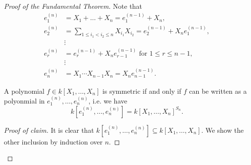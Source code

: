 \begin{proof}[Proof of the Fundamental Theorem]
 Note that
 \begin{align*}
  e^{(n)}_1 &= X_1 + \ldots + X_n = e_1^{(n-1)} + X_n, \\
  e^{(n)}_2 &= \sum_{1 \leq i_1 < i_2 \leq n} X_{i_1} X_{i_2} = e_2^{(n-1)} + X_n e_1^{(n-1)}, \\
            &\vdots \tag{$\ast$}\\ 
  e^{(n)}_r &= e^{(n-1)}_r + X_n e^{(n-1)}_{r-1} \text{ for } 1 \leq r \leq n-1, \\
            &\vdots \\
  e^{(n)}_n &= X_1 \cdots X_{n-1} X_n = X_n e^{(n-1)}_{n-1}.
 \end{align*}
 \begin{claim}
  A polynomial $f \in k[X_1, \ldots, X_n]$ is symmetric if and only if $f$ can be written as a polyonmial in $e^{(n)}_1, \ldots, e^{(n)}_n$, i.e. we have
  \[
   k\left[e^{(n)}_1, \ldots, e^{(n)}_n\right] = k[X_1, \ldots, X_n]^{S_n}.
  \]
 \end{claim}
 \begin{proof}[Proof of claim]
  It is clear that $k\left[e^{(n)}_1, \ldots, e^{(n)}_n\right] \subseteq k[X_1, \ldots, X_n]$. We show the other inclusion by induction over $n$.
  

\end{proof}
\end{proof}
